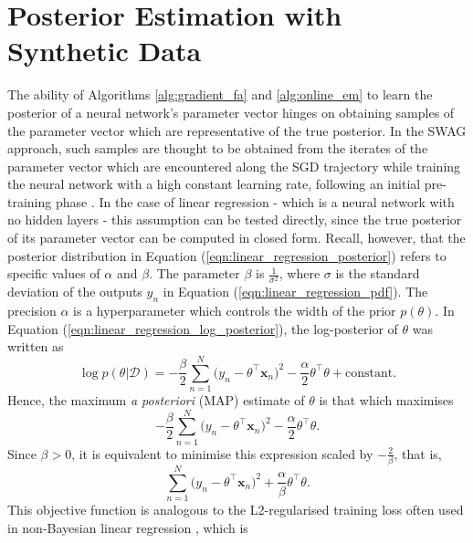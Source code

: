 \documentclass[msc,deptreport.inf]{infthesis} %
\newcommand{\matr}[1]{\mathbf{#1}}
\begin{document}
\section{Posterior Estimation with Synthetic Data}\label{sec:linear_regression_posterior_experiments}

The ability of Algorithms \ref{alg:gradient_fa} and \ref{alg:online_em} to learn the posterior of a neural network's parameter vector hinges on obtaining samples of the parameter vector which are representative of the true posterior. In the SWAG approach, such samples are thought to be obtained from the iterates of the parameter vector which are encountered along the SGD trajectory while training the neural network with a high constant learning rate, following an initial pre-training phase \cite{maddox2019}. In the case of linear regression - which is a neural network with no hidden layers - this assumption can be tested directly, since the true posterior of its parameter vector can be computed in closed form. Recall, however, that the posterior distribution in Equation (\ref{eqn:linear_regression_posterior}) refers to specific values of $\alpha$ and $\beta$. The parameter $\beta$ is $\frac{1}{\sigma^2}$, where $\sigma$ is the standard deviation of the outputs $y_n$ in Equation (\ref{eqn:linear_regression_pdf}). The precision $\alpha$ is a hyperparameter which controls the width of the prior $p(\theta)$. In Equation (\ref{eqn:linear_regression_log_posterior}), the log-posterior of $\theta$ was written as 
\begin{equation}
	\log p(\theta | \mathcal{D}) 
	= -\frac{\beta}{2} \sum_{n=1}^N \big(y_n - \theta^\intercal \matr{x}_n \big)^2 
	-\frac{\alpha}{2} \theta^\intercal \theta 
	+ \text{constant}.
\end{equation}
Hence, the maximum \emph{a posteriori} (MAP) estimate of $\theta$ is that which maximises
\begin{equation}
	-\frac{\beta}{2} \sum_{n=1}^N \big(y_n - \theta^\intercal \matr{x}_n \big)^2 
	-\frac{\alpha}{2} \theta^\intercal \theta.
\end{equation}
Since $\beta > 0$, it is equivalent to minimise this expression scaled by $-\frac{2}{\beta}$, that is,
\begin{equation}
	\sum_{n=1}^N \big(y_n - \theta^\intercal \matr{x}_n \big)^2 
	+ \frac{\alpha}{\beta} \theta^\intercal \theta.
\end{equation}
This objective function is analogous to the L2-regularised training loss often used in non-Bayesian linear regression \cite{barber2007}, which is 
\end{document}
